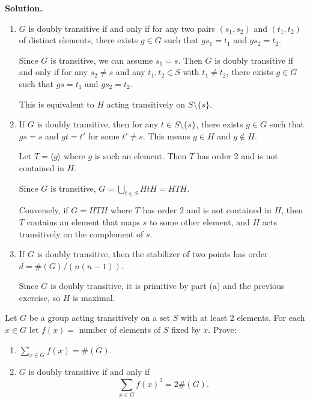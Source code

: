 \noindent\textbf{Solution.}
\begin{enumerate}[label=(\alph*)]
\item $G$ is doubly transitive if and only if for any two pairs $(s_1, s_2)$ and $(t_1, t_2)$ of distinct elements, there exists $g \in G$ such that $gs_1 = t_1$ and $gs_2 = t_2$.

Since $G$ is transitive, we can assume $s_1 = s$. Then $G$ is doubly transitive if and only if for any $s_2 \neq s$ and any $t_1, t_2 \in S$ with $t_1 \neq t_2$, there exists $g \in G$ such that $gs = t_1$ and $gs_2 = t_2$.

This is equivalent to $H$ acting transitively on $S \setminus \{s\}$.

\item If $G$ is doubly transitive, then for any $t \in S \setminus \{s\}$, there exists $g \in G$ such that $gs = s$ and $gt = t'$ for some $t' \neq s$. This means $g \in H$ and $g \notin H$.

Let $T = \langle g \rangle$ where $g$ is such an element. Then $T$ has order 2 and is not contained in $H$.

Since $G$ is transitive, $G = \bigcup_{t \in S} HtH = HTH$.

Conversely, if $G = HTH$ where $T$ has order 2 and is not contained in $H$, then $T$ contains an element that maps $s$ to some other element, and $H$ acts transitively on the complement of $s$.

\item If $G$ is doubly transitive, then the stabilizer of two points has order $d = \#(G)/(n(n-1))$.

Since $G$ is doubly transitive, it is primitive by part (a) and the previous exercise, so $H$ is maximal.
\end{enumerate}

\begin{problembox}
Let $G$ be a group acting transitively on a set $S$ with at least 2 elements. For each $x \in G$ let $f(x) = $ number of elements of $S$ fixed by $x$. Prove:
\begin{enumerate}[label=(\alph*)]
\item $\sum_{x \in G} f(x) = \#(G).$
\item $G$ is doubly transitive if and only if
\[\sum_{x \in G} f(x)^2 = 2 \#(G).\]
\end{enumerate}
\end{problembox}

